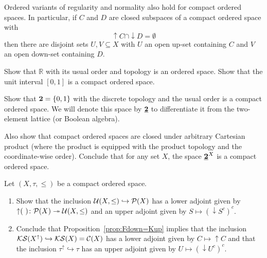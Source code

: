 \begin{exercise}\label{exer:ordnorm}
Ordered variants of regularity and normality also hold for compact ordered spaces. In particular, if $C$ and $D$ are closed subspaces of a compact ordered space with
\[
{\uparrow} C\cap{\downarrow}D=\emptyset
\]
then there are disjoint sets $U,V\subseteq X$ with $U$ an open up-set containing $C$ and $V$ an open down-set containing $D$.
\end{exercise}

\begin{exercise}\label{exer:unitint}
Show that $\mathbb{R}$ with its usual order and topology is an ordered space. Show that the unit interval $[0,1]$ is a compact ordered space.
\end{exercise}

\begin{exercise}\label{exer:prodCOS}
Show that ${\bf 2}=\{0,1\}$ with the discrete topology and the usual order is a compact ordered space. We will denote this space by $\underline{\bf 2}$ to differentiate it from the two-element lattice (or Boolean algebra).

Also show that compact ordered spaces are closed under arbitrary Cartesian product (where the product is equipped with the product topology and the coordinate-wise order). Conclude that for any set $X$, the space $\underline{\bf 2}^X$ is a compact ordered space.
\end{exercise}

\begin{exercise}\label{exer:COSadjunction}
Let $(X,\tau,\leq)$ be a compact ordered space.
\begin{enumerate}
\item Show that  the inclusion $\mathcal{U}(X,\leq)\hookrightarrow\mathcal{P}(X)$ has a lower adjoint given by ${\uparrow}(\ )\colon\cP(X)\twoheadrightarrow\Up(X,\leq)$ and an upper adjoint given by $S\mapsto ({\downarrow}S^c)^c$.
\item Conclude that Proposition~\ref{prop:Fdown=Kup} implies that the inclusion $\mathcal{KS}(X^{\uparrow})\hookrightarrow\mathcal{KS}(X)=\mathcal{C}(X)$ has a lower adjoint given by $C\mapsto{\uparrow}C$ and that the inclusion $\tau^{\uparrow}\hookrightarrow \tau$ has an upper adjoint given by $U\mapsto({\downarrow}U^c)^c$.
\end{enumerate}
\end{exercise}

